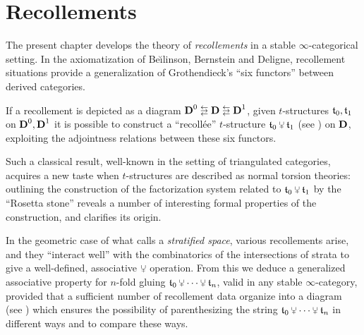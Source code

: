 \chapter{Recollements}\label{chap:recol}
\thispagestyle{empty}

The present chapter develops the theory of \emph{recollements} in a stable $\infty$\hyp{}categorical setting. In the axiomatization of Be\u\i linson, Bernstein and Deligne, recollement situations provide a generalization of Grothendieck's ``six functors'' between derived categories. 

If a recollement is depicted as a diagram $\D^0\lrlarrows \D \lrlarrows \D^1$, given $t$\hyp{}structures $\mathfrak{t}_0,\mathfrak{t}_1$ on $\textbf{D}^0, \textbf{D}^1$ it is possible to construct a ``recoll\'ee'' $t$\hyp{}structure $\tee_0\glue\tee_1$ (see \adef {}) on $\textbf{D}$, exploiting the adjointness relations between these six functors.

Such a classical result, well\hyp{}known in the setting of triangulated categories, acquires a new taste when $t$\hyp{}structures are described as normal torsion theories: outlining the construction of the factorization system related to $\tee_0\glue\tee_1$ by the ``Rosetta stone'' reveals a number of interesting formal properties of the construction, and clarifies its origin.

In the geometric case of what \cite{BBDPervers} calls a \emph{stratified space}, various recollements arise, and they ``interact well'' with the combinatorics of the intersections of strata to give a well\hyp{}defined, associative $\glue$ operation. From this we deduce a generalized associative property for $n$\hyp{}fold gluing $\tee_0\glue\cdots\glue \tee_n$, valid in any stable $\infty$\hyp{}category, provided that a sufficient number of recollement data organize into a diagram (see \adef {}) which ensures the possibility of parenthesizing the string $\tee_0 \glue \cdots \glue \tee_n$ in different ways and to compare these ways.
